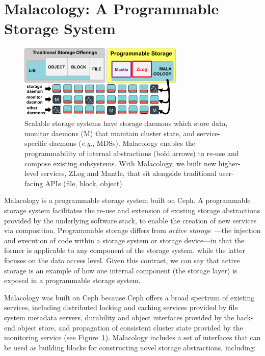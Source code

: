 \section{Malacology: A Programmable Storage System}

\begin{figure}[tb]
\centering
\includegraphics[width=0.7\textwidth]{./chapters/background/figures/overview.png}
\caption{Scalable storage systems have storage daemons which store data,
monitor daemons (M) that maintain cluster state, and service-specific daemons
({\it e.g.}, MDSs). Malacology enables the programmability of
internal abstractions (bold arrows) to re-use and compose existing subsystems.
With Malacology, we built new higher-level services, ZLog and Mantle, that sit
alongside traditional user-facing APIs (file, block,
object).}\label{fig:overview}
\end{figure}

Malacology is a programmable storage system built on Ceph. A programmable
storage system facilitates the re-use and extension of existing storage
abstractions provided by the underlying software stack, to enable the creation
of new services via composition. Programmable storage differs from
\emph{active storage}~\cite{riedel:vldb98}---the injection and execution of
code within a storage system or storage device---in that the former is
applicable to any component of the storage system, while the latter focuses on
the data access level. Given this contrast, we can say that active storage is
an example of how one internal component (the storage layer) is exposed in a
programmable storage system.

Malacology was built on Ceph because Ceph offers a broad spectrum of existing
services, including distributed locking and caching services provided by file
system metadata servers, durability and object interfaces provided by the
back-end object store, and propagation of consistent cluster state provided by
the monitoring service (see Figure~\ref{fig:overview}).  Malacology includes a
set of interfaces that can be used as building blocks for constructing novel
storage abstractions, including:


